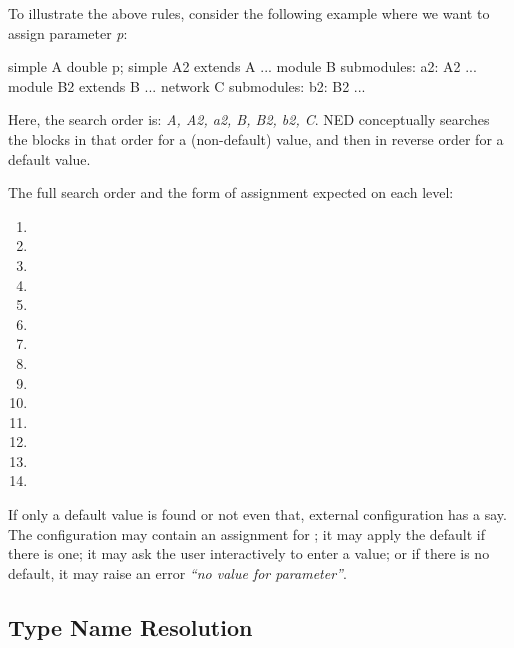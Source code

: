 To illustrate the above rules, consider the following example where we
want to assign parameter \textit{p}:

\begin{ned}
simple A { double p; }
simple A2 extends A {...}
module B { submodules: a2: A2 {...} }
module B2 extends B {...}
network C { submodules: b2: B2 {...} }
\end{ned}

Here, the search order is: \textit{A, A2, a2, B, B2, b2, C}. NED
conceptually searches the  blocks in that order for a
(non-default) value, and then in reverse order for a default value.

The full search order and the form of assignment expected on each level:

\begin{enumerate}
  \item {}
  \item {}
  \item {}
  \item {}
  \item {}
  \item {}
  \item {}
  \item {}
  \item {}
  \item {}
  \item {}
  \item {}
  \item {}
  \item {}
\end{enumerate}

If only a default value is found or not even that, external configuration
has a say. The configuration may contain an assignment for ;
it may apply the default if there is one; it may ask the user interactively
to enter a value; or if there is no default, it may raise an error
\textit{``no value for parameter''}.



\subsection{Type Name Resolution}
\label{sec:ned-ref:type-name-resolution}

